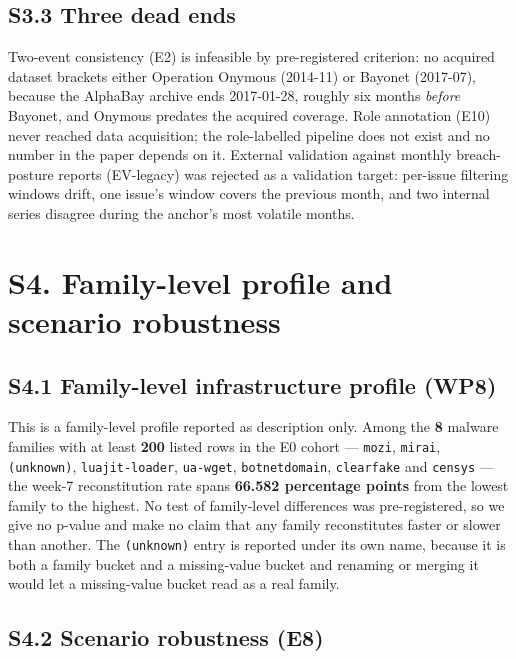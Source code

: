 \documentclass[11pt,a4paper]{article}
\begin{document}
\subsection*{S3.3 Three dead ends}

Two-event consistency (E2) is infeasible by pre-registered criterion: no
acquired dataset brackets either Operation Onymous (2014-11) or Bayonet
(2017-07), because the AlphaBay archive ends 2017-01-28, roughly six months
\emph{before} Bayonet, and Onymous predates the acquired coverage. Role
annotation (E10) never reached data acquisition; the role-labelled pipeline does
not exist and no number in the paper depends on it. External validation against
monthly breach-posture reports (EV-legacy) was rejected as a validation target:
per-issue filtering windows drift, one issue's window covers the previous month,
and two internal series disagree during the anchor's most volatile months.

\section*{S4. Family-level profile and scenario robustness}

\subsection*{S4.1 Family-level infrastructure profile (WP8)}

This is a family-level profile reported as description only. Among the
\textbf{8} malware families with at least \textbf{200} listed rows in the E0
cohort --- \texttt{mozi}, \texttt{mirai}, \texttt{(unknown)},
\texttt{luajit-loader}, \texttt{ua-wget}, \texttt{botnetdomain},
\texttt{clearfake} and \texttt{censys} --- the week-7 reconstitution rate spans
\textbf{66.582 percentage points} from the lowest family to the highest. No test
of family-level differences was pre-registered, so we give no p-value and make no
claim that any family reconstitutes faster or slower than another. The
\texttt{(unknown)} entry is reported under its own name, because it is both a
family bucket and a missing-value bucket and renaming or merging it would let a
missing-value bucket read as a real family.

\subsection*{S4.2 Scenario robustness (E8)}
\end{document}
